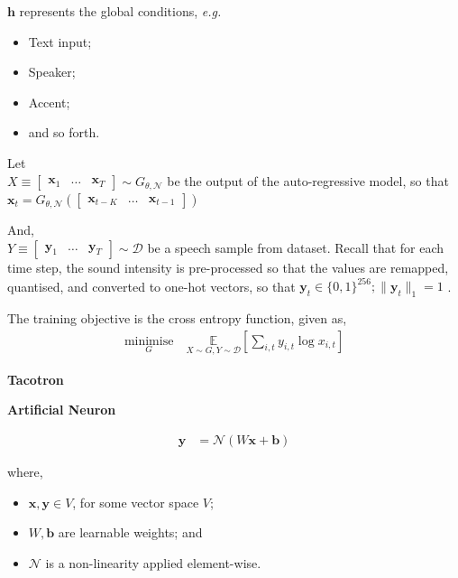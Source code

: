 \documentclass[12pt]{tiet-question-paper}
\begin{document}
{\(\mathbf{h}\) represents the global conditions, \emph{e.g.}
\begin{itemize}
\item Text input;
\item Speaker;
\item Accent;
\item and so forth.
\end{itemize}

\newpage

Let \\[0pt]
\(X\equiv\begin{bmatrix} \mathbf{x}_1 & \ldots &
\mathbf{x}_T \end{bmatrix} \sim G_{\theta,\mathcal{N}}\)
be the output of the auto-regressive model, so that \\[0pt]
\(\mathbf{x}_{t} = G_{\theta,\mathcal{N}}
\left( \begin{bmatrix} \mathbf{x}_{t-K} & \ldots &
\mathbf{x}_{t-1} \end{bmatrix} \right)\)

\bvrskipline[0.25]

And, \\[0pt]
\(Y\equiv\begin{bmatrix} \mathbf{y}_1 & \ldots &
\mathbf{y}_T \end{bmatrix} \sim \mathcal{D}\) be a
speech sample from dataset.  Recall that for each time
step, the sound intensity is pre-processed so that the
values are remapped, quantised, and converted to
one-hot vectors, so that \(\mathbf{y}_t\in\{0,1\}^{256};
\|\mathbf{y}_t\|_{1}=1\) .

\bvrskipline[0.25]

The training objective is the cross entropy function,
given as,
\begin{align*}
  \underset{G}{\text{minimise}}\quad
  \underset{X\sim G, Y\sim\mathcal{D}}{\mathbb{E}}
  \left[ \sum_{i,t} y_{i,t}\log x_{i,t} \right]
\end{align*}


\newpage

\textbf{Tacotron}

\textbf{Artificial Neuron}

\begin{align*}
  \mathbf{y} &= \mathcal{N}(W\mathbf{x} + \mathbf{b})
\end{align*}

where,
\begin{itemize}
\item \(\mathbf{x},\mathbf{y}\in V\), for some vector space
\(V\);
\item \(W,\mathbf{b}\) are learnable weights; and
\item \(\mathcal{N}\) is a non-linearity applied
element-wise.
\end{itemize}

}
\end{document}
